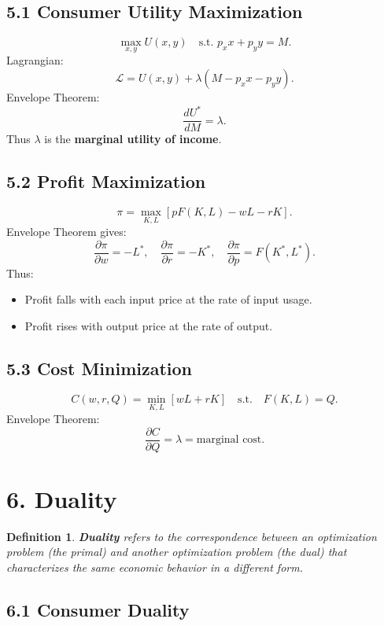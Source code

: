 \documentclass[12pt]{article}
\newtheorem{definition}{Definition}
\begin{document}
\subsection*{5.1 Consumer Utility Maximization}
\[
\max_{x,y} U(x,y) \quad \text{s.t. } p_x x + p_y y = M.
\]
Lagrangian:
\[
\mathcal{L}=U(x,y)+\lambda(M-p_x x-p_y y).
\]
Envelope Theorem:
\[
\frac{dU^*}{dM}=\lambda.
\]
Thus $\lambda$ is the \textbf{marginal utility of income}.

\subsection*{5.2 Profit Maximization}
\[
\pi=\max_{K,L}[pF(K,L)-wL-rK].
\]
Envelope Theorem gives:
\[
\frac{\partial \pi}{\partial w}=-L^*,\quad 
\frac{\partial \pi}{\partial r}=-K^*,\quad
\frac{\partial \pi}{\partial p}=F(K^*,L^*).
\]
Thus:
\begin{itemize}
\item Profit falls with each input price at the rate of input usage.
\item Profit rises with output price at the rate of output.
\end{itemize}

\subsection*{5.3 Cost Minimization}
\[
C(w,r,Q)=\min_{K,L}[wL+rK]\quad\text{s.t.}\quad F(K,L)=Q.
\]
Envelope Theorem:
\[
\frac{\partial C}{\partial Q}=\lambda=\text{marginal cost}.
\]

\section*{6. Duality}

\begin{definition}
\textbf{Duality} refers to the correspondence between an optimization problem (the \emph{primal}) and another optimization problem (the \emph{dual}) that characterizes the same economic behavior in a different form.
\end{definition}

\subsection*{6.1 Consumer Duality}
\end{document}
